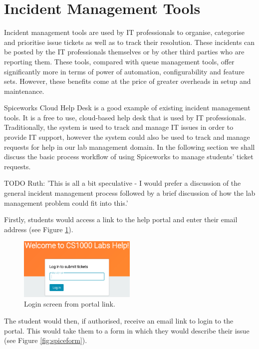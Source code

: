 \newpage
\section{Incident Management Tools}

Incident management tools are used by IT professionals to organise, categorise and prioritise issue tickets as well as to track their resolution. These incidents can be posted by the IT professionals themselves or by other third parties who are reporting them. These tools, compared with queue management tools, offer significantly more in terms of power of automation, configurability and feature sets. However, these benefits come at the price of greater overheads in setup and maintenance.

Spiceworks Cloud Help Desk is a good example of existing incident management tools. It is a free to use, cloud-based help desk that is used by IT professionals. Traditionally, the system is used to track and manage IT issues in order to provide IT support, however the system could also be used to track and manage requests for help in our lab management domain. In the following section we shall discuss the basic process workflow of using Spiceworks to manage students' ticket requests.

TODO Ruth: 'This is all a bit speculative - I would prefer a discussion of the general incident management process followed by a brief discussion of how the lab management problem could fit into this.'

Firstly, students would access a link to the help portal and enter their email address (see Figure \ref{fig:spiceemail}).

\FloatBarrier
\begin{figure}[H]
  \centering
  \includegraphics[width=0.5\textwidth]{2context/images/SWportalLogin.png}
  \caption{Login screen from portal link.}
  \label{fig:spiceemail}
\end{figure}

The student would then, if authorised, receive an email link to login to the portal. This would take them to a form in which they would describe their issue (see Figure \ref{fig:spiceform}).

